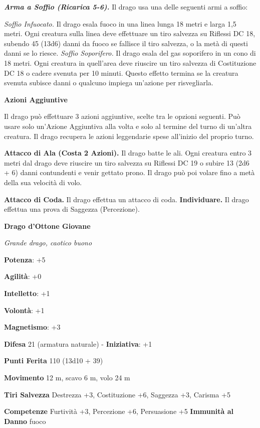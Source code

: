 \begin{multicols}{2}
\emph{\textbf{Arma a Soffio (Ricarica 5-6).}} Il drago usa una delle
seguenti armi a soffio:

\emph{Soffio Infuocato.} Il drago esala fuoco in una linea lunga 18
metri e larga 1,5 metri. Ogni creatura sulla linea deve effettuare un
tiro salvezza su Riflessi DC 18, subendo 45 (13d6) danni da fuoco se
fallisce il tiro salvezza, o la metà di questi danni se lo riesce.
\emph{Soffio Soporifero.} Il drago esala del gas soporifero in un cono
di 18 metri. Ogni creatura in quell'area deve riuscire un tiro salvezza
di Costituzione DC 18 o cadere svenuta per 10 minuti. Questo effetto
termina se la creatura svenuta subisce danni o qualcuno impiega
un'azione per risvegliarla.

\textbf{Azioni Aggiuntive}

Il drago può effettuare 3 azioni aggiuntive, scelte tra le opzioni
seguenti. Può usare solo un'Azione Aggiuntiva alla volta e solo al
termine del turno di un'altra creatura. Il drago recupera le azioni
leggendarie spese all'inizio del proprio turno.

\textbf{Attacco di Ala (Costa 2 Azioni).} Il drago batte le ali. Ogni
creatura entro 3 metri dal drago deve riuscire un tiro salvezza su Riflessi DC 19 o subire 13 (2d6 + 6) danni contundenti e venir gettato
prono. Il drago può poi volare fino a metà della sua velocità di volo.

\textbf{Attacco di Coda.} Il drago effettua un attacco di coda.
\textbf{Individuare.} Il drago effettua una prova di Saggezza
(Percezione).



\textbf{Drago d'Ottone Giovane}

\emph{Grande drago, caotico buono}

\textbf{Potenza}: +5

\textbf{Agilità}: +0

\textbf{Intelletto}: +1

\textbf{Volontà}: +1

\textbf{Magnetismo}: +3

\textbf{Difesa} 21 (armatura naturale) - \textbf{Iniziativa}: +1

\textbf{Punti Ferita} 110 (13d10 + 39)

\textbf{Movimento} 12 m, scavo 6 m, volo 24 m

\textbf{Tiri Salvezza} Destrezza +3, Costituzione +6, Saggezza +3,
Carisma +5

\textbf{Competenze} Furtività +3, Percezione +6, Persuasione +5
\textbf{Immunità al Danno} fuoco


\end{multicols}

